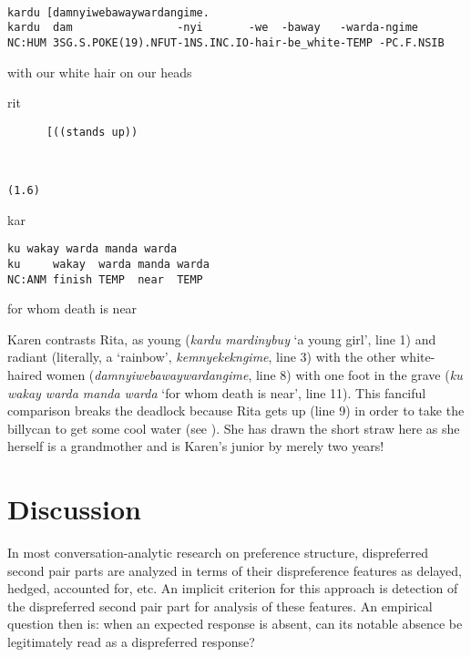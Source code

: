 \documentclass[output=paper,nonflat,colorlinks,citecolor=brown]{langsci/langscibook}
\begin{document}
%
\begin{transbox}{8}{~}
\begin{verbatim}
kardu [damnyiwebawaywardangime.
kardu  dam                -nyi       -we  -baway   -warda-ngime
NC:HUM 3SG.S.POKE(19).NFUT-1NS.INC.IO-hair-be_white-TEMP -PC.F.NSIB
\end{verbatim}
with our white hair on our heads
\end{transbox}
%
\begin{transbox}{9}{rit}
\begin{verbatim}
      [((stands up))
\end{verbatim}
\end{transbox}
%
\begin{transbox}{10}{~}
\begin{verbatim}
(1.6)
\end{verbatim}
\end{transbox}\vspace{-1mm}
%
\begin{transbox}{11}{kar}
\begin{verbatim}
ku wakay warda manda warda
ku     wakay  warda manda warda
NC:ANM finish TEMP  near  TEMP
\end{verbatim}
for whom death is near
\end{transbox}\bigskip

Karen contrasts Rita, as young (\textit{kardu mardinybuy} ‘a young girl’, line 1) and radiant (literally, a ‘rainbow’, \textit{kemnyekekngime}, line 3) with the other white-haired women (\textit{damnyiwebawaywardangime}, line 8) with one foot in the grave (\textit{ku wakay warda manda warda} ‘for whom death is near’, line 11). This fanciful comparison breaks the deadlock because Rita gets up (line 9) in order to take the billycan to get some cool water (see ). She has drawn the short straw here as she herself is a grandmother and is Karen’s junior by merely two years!

\section{Discussion}\label{sec:blythe:7}

In most conversation-analytic research on preference structure, dispreferred second pair parts are analyzed in terms of their dispreference features as delayed, hedged, accounted for, etc. An implicit criterion for this approach is detection of the dispreferred second pair part for analysis of these features. An empirical question then is: when an expected response is absent, can its notable absence be legitimately read as a dispreferred response?
\end{document}

